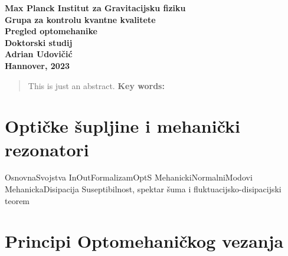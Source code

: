 \documentclass[10pt,leqno,a4paper]{article}
\begin{document}
\begin{titlepage}
	\begin{center}
		{\LARGE \textbf{Max Planck Institut za Gravitacijsku fiziku}}\\[0.1cm]
		{\LARGE \textbf{Grupa za kontrolu kvantne kvalitete}}\\[1.5cm]
		{\Huge \textbf{Pregled optomehanike}}\\[1.0cm]
		{\Large \textbf{Doktorski studij}}\\[2.5cm]
		{\LARGE \textbf{Adrian Udovičić}}\\[14cm]
		\large\textbf{{Hannover, 2023} }
	\end{center}
\end{titlepage}

\newpage
{}
\begin{abstract}
	This is just an abstract.
	\vfill
	\textbf{Key words:}
\end{abstract}
\newpage
\tableofcontents
\hrulefill
\newpage

\part{Optičke šupljine i mehanički rezonatori}
{OsnovnaSvojstva}
\newpage
{InOutFormalizamOptS}
{MehanickiNormalniModovi}
{MehanickaDisipacija}
{Suseptibilnost, spektar šuma i fluktuacijsko-disipacijski teorem}

\newpage
\part{Principi Optomehaničkog vezanja}
\newpage


\listoftables
\listoffigures
\end{document}
